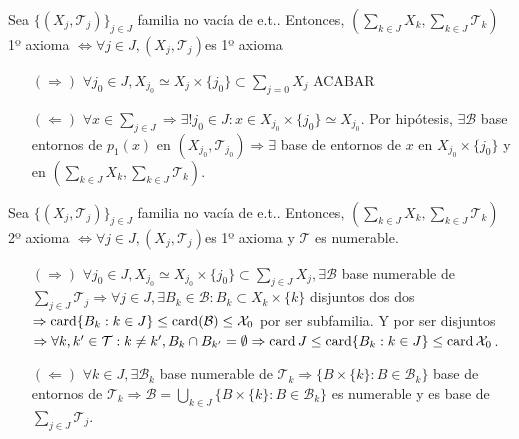 \begin{prop}
  Sea $\{ ( X_{j}, \mathcal{T}_{j} ) \}_{j \in J}$ familia no vacía de e.t.. Entonces, $( \sum_{k \in J} X_{k}, \sum_{k \in J} \mathcal{T}_{k})$ 1º axioma $\Leftrightarrow \forall j \in J, ( X_{j}, \mathcal{T}_{j} )$es 1º axioma
\end{prop}

\begin{dem}
  \begin{enumerate}[label=(\roman*)]
    \item []
    \item [$(\Rightarrow)$] $\forall j_{0} \in J, X_{j_{0}} \simeq X_{j} \times \{ j_{0} \} \subset \sum_{j = 0}^{} X_{j}$ ACABAR
    \item [$(\Leftarrow)$] $\forall x \in \sum_{j \in J} \Rightarrow \exists ! j_{0} \in J :  x \in X_{j_{0}} \times \{  j_{0} \} \simeq X_{j_{0}}$. Por hipótesis, $\exists \mathcal{B}$ base entornos de $p_{1}(x)$ en $( X_{j_{0}}, \mathcal{T}_{j_{0}} ) \Rightarrow \exists$ base de entornos de $x$ en $X_{j_{0}} \times \{ j_{0} \}$ y en $( \sum_{k \in J} X_{k}, \sum_{k \in J} \mathcal{T}_{k})$.
  \end{enumerate}
\end{dem}

\begin{prop}
  Sea $\{ ( X_{j}, \mathcal{T}_{j} ) \}_{j \in J}$ familia no vacía de e.t.. Entonces, $( \sum_{k \in J} X_{k}, \sum_{k \in J} \mathcal{T}_{k})$ 2º axioma $\Leftrightarrow \forall j \in J, ( X_{j}, \mathcal{T}_{j} )$es 1º axioma y $\mathcal{T}$ es numerable.
\end{prop}

\begin{dem}
  \begin{enumerate}[label=(\roman*)]
    \item []
    \item [$(\Rightarrow)$] $\forall j_{0} \in J, X_{j_{0}} \simeq X_{j_{0}} \times \{ j_{0} \} \subset \sum_{j \in J} X_{j}, \exists \mathcal{B}$ base numerable de $\sum_{j \in J} \mathcal{T}_{j} \Rightarrow \forall j \in J, \exists B_{k} \in \mathcal{B} : B_{k} \subset X_{k} \times \{ k \}$ disjuntos dos dos $\Rightarrow \operatorname{card} \{ B_{k} : k \in J \} \leq \operatorname{card}(\mathcal{B}) \leq \mathcal{X}_{0}$ por ser subfamilia. Y por ser disjuntos $\Rightarrow \forall k, k' \in \mathcal{T} : k \neq k', B_{k} \cap B_{k'} = \emptyset \Rightarrow \operatorname{card} J \leq \operatorname{card} \{  B_{k} : k \in J \} \leq \operatorname{card} \mathcal{X}_{0}$.
    \item [$(\Leftarrow)$] $\forall k \in J, \exists \mathcal{B}_{k}$ base numerable de $\mathcal{T}_{k} \Rightarrow \{  B \times \{ k \} : B \in \mathcal{B}_{k} \}$ base de entornos de $\mathcal{T}_{k} \Rightarrow \mathcal{B} = \bigcup_{k \in J} \{ B \times \{ k \}: B \in \mathcal{B}_{k} \}$ es numerable y es base de $\sum_{j \in J} \mathcal{T}_{j}$.
  \end{enumerate}
\end{dem}



